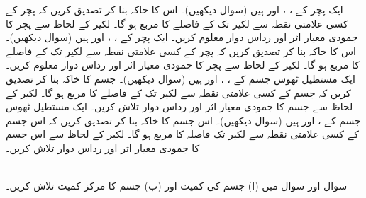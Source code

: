 ایک پچر  کے ،  ، اور  ہیں     (سوال  دیکھیں)۔  اس کا خاکہ بنا کر تصدیق کریں کہ  پچر کے کسی علامتی  نقطہ   سے  لکیر   تک کے   فاصلے کا مربع   ہو گا۔ لکیر  کے لحاظ سے  پچر کا جمودی معیار اثر اور رداس دوار معلوم کریں۔
ایک پچر  کے ، ،  اور  ہیں     (سوال  دیکھیں)۔  اس کا خاکہ بنا کر تصدیق کریں کہ  پچر کے کسی علامتی  نقطہ   سے  لکیر   تک کے   فاصلے کا مربع   ہو گا۔ لکیر  کے لحاظ سے   پچر کا جمودی معیار اثر اور رداس دوار معلوم کریں۔
ایک مستطیل  ٹھوس جسم کے ،  ، اور  ہیں (سوال  دیکھیں)۔  جسم کا خاکہ بنا کر تصدیق کریں  کہ  جسم کے کسی علامتی نقطہ  سے لکیر   تک کے  فاصلے کا مربع  ہو گا۔ لکیر  کے لحاظ سے  جسم کا جمودی معیار اثر اور رداس دوار تلاش کریں۔
ایک مستطیل  ٹھوس جسم کے ،  اور  ہیں (سوال  دیکھیں)۔  اس جسم کا خاکہ بنا کر تصدیق کریں  کہ اس جسم کے کسی علامتی نقطہ  سے لکیر   تک فاصلہ کا مربع  ہو گا۔ لکیر  کے لحاظ سے اس جسم کا جمودی معیار اثر اور رداس دوار تلاش کریں۔

\\
سوال  اور سوال  میں (ا) جسم کی کمیت اور (ب)  جسم  کا مرکز کمیت تلاش کریں۔

